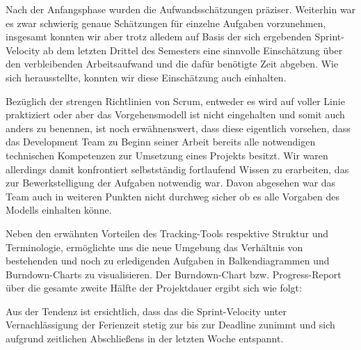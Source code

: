 	Nach der Anfangsphase wurden die Aufwandsschätzungen präziser. Weiterhin war es zwar schwierig genaue Schätzungen für einzelne Aufgaben vorzunehmen, insgesamt konnten wir aber trotz alledem auf Basis der sich ergebenden Sprint-Velocity ab dem letzten Drittel des Semesters eine sinnvolle Einschätzung über den verbleibenden Arbeitsaufwand und die dafür benötigte Zeit abgeben. Wie sich herausstellte, konnten wir diese Einschätzung auch einhalten. 

	Bezüglich der strengen Richtlinien von Scrum, entweder es wird auf voller Linie praktiziert oder aber das Vorgehensmodell ist nicht eingehalten und somit auch anders zu benennen, ist noch erwähnenswert, dass diese eigentlich vorsehen, dass das Development Team zu Beginn seiner Arbeit bereits alle notwendigen technischen Kompetenzen zur Umsetzung eines Projekts besitzt. Wir waren allerdings damit konfrontiert selbstständig fortlaufend Wissen zu erarbeiten, das zur Bewerkstelligung der Aufgaben notwendig war. Davon abgesehen war das Team auch in weiteren Punkten nicht durchweg sicher ob es alle Vorgaben des Modells einhalten könne.

	 Neben den erwähnten Vorteilen des Tracking-Tools respektive Struktur und Terminologie, ermöglichte uns die neue Umgebung das Verhältnis von bestehenden und noch zu erledigenden Aufgaben in Balkendiagrammen und Burndown-Charts zu visualisieren. Der Burndown-Chart bzw. Progress-Report über die gesamte zweite Hälfte der Projektdauer ergibt sich wie folgt:

	Aus der Tendenz ist ersichtlich, dass das die Sprint-Velocity unter Vernachlässigung der Ferienzeit stetig zur bis zur Deadline zunimmt und sich aufgrund zeitlichen Abschließens in der letzten Woche  entspannt.